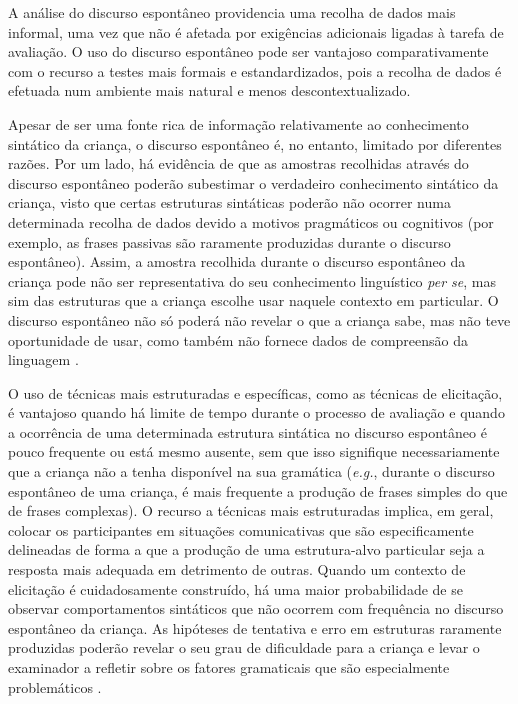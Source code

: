 \documentclass[output=paper,colorlinks,citecolor=brown,booklanguage=portuguese]{langscibook}
\begin{document}
A análise do discurso espontâneo providencia uma recolha de dados mais informal, uma vez que não é afetada por exigências adicionais ligadas à tarefa de avaliação. O uso do discurso espontâneo pode ser vantajoso comparativamente com o recurso a testes mais formais e estandardizados, pois a recolha de dados é efetuada num ambiente mais natural e menos descontextualizado. 

Apesar de ser uma fonte rica de informação relativamente ao conhecimento sintático da criança, o discurso espontâneo é, no entanto, limitado por diferentes razões. Por um lado, há evidência de que as amostras recolhidas através do discurso espontâneo poderão subestimar o verdadeiro conhecimento sintático da criança, visto que certas estruturas sintáticas poderão não ocorrer numa determinada recolha de dados devido a motivos pragmáticos ou cognitivos (por exemplo, as frases passivas são raramente produzidas durante o discurso espontâneo). Assim, a amostra recolhida durante o discurso espontâneo da criança pode não ser representativa do seu conhecimento linguístico \emph{per se}, mas sim das estruturas que a criança escolhe usar naquele contexto em particular. O discurso espontâneo não só poderá não revelar o que a criança sabe, mas não teve oportunidade de usar, como também não fornece dados de compreensão da linguagem \citep{TagerFlushberg2000}.

O uso de técnicas mais estruturadas e específicas, como as técnicas de elicitação, é vantajoso quando há limite de tempo durante o processo de avaliação e quando a ocorrência de uma determinada estrutura sintática no discurso espontâneo é pouco frequente ou está mesmo ausente, sem que isso signifique necessariamente que a criança não a tenha disponível na sua gramática (\emph{e.g.}, durante o discurso espontâneo de uma criança, é mais frequente a produção de frases simples do que de frases complexas). O recurso a técnicas mais estruturadas implica, em geral, colocar os participantes em situações comunicativas que são especificamente delineadas de forma a que a produção de uma estrutura-alvo particular seja a resposta mais adequada em detrimento de outras. Quando um contexto de elicitação é cuidadosamente construído, há uma maior probabilidade de se observar comportamentos sintáticos que não ocorrem com frequência no discurso espontâneo da criança. As hipóteses de tentativa e erro em estruturas raramente produzidas poderão revelar o seu grau de dificuldade para a criança e levar o examinador a refletir sobre os fatores gramaticais que são especialmente problemáticos \citep{Zukowski2009}.
\end{document}
